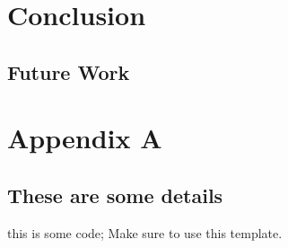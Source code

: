 \documentclass[12pt, a4paper]{report}
\newenvironment{code}
{\footnotesize\verbatim}{\endverbatim\normalfont}
\theoremstyle{definition}
\theoremstyle{definition}%
\theoremstyle{definition}%
\theoremstyle{definition}%
\theoremstyle{definition}%
\theoremstyle{definition}%
\begin{document}
\chapter{Conclusion}
\section{Future Work}
\appendix

\chapter{Appendix A}
\section{These are some details}
\begin{code}
	this is some code;
	Make sure to use this template.
\end{code}


\bibliomatter




\end{document}
